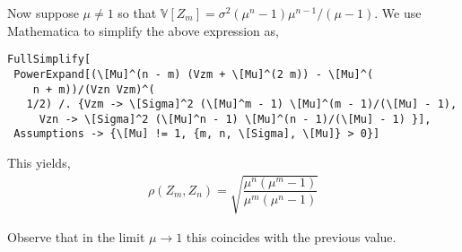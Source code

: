 \begin{solution}[Solution]
Now suppose \( \mu\neq 1 \) so that \( \mathbb{V}[Z_m] = \sigma^2(\mu^n-1)\mu^{n-1}/(\mu-1) \). We use Mathematica to simplify the above expression as,
\begin{lstlisting}
FullSimplify[
 PowerExpand[(\[Mu]^(n - m) (Vzm + \[Mu]^(2 m)) - \[Mu]^(
    n + m))/(Vzn Vzm)^(
   1/2) /. {Vzm -> \[Sigma]^2 (\[Mu]^m - 1) \[Mu]^(m - 1)/(\[Mu] - 1),
     Vzn -> \[Sigma]^2 (\[Mu]^n - 1) \[Mu]^(n - 1)/(\[Mu] - 1) }], 
 Assumptions -> {\[Mu] != 1, {m, n, \[Sigma], \[Mu]} > 0}]
\end{lstlisting}

This yields,
\begin{align*}
    \rho(Z_m,Z_n) = \sqrt{\dfrac{\mu^n(\mu^m-1)}{\mu^m(\mu^n-1)}}
\end{align*}

Observe that in the limit \( \mu\to 1 \) this coincides with the previous value.

\iffalse
\begin{align*}
    \rho(Z_m,Z_n) &= \dfrac{\operatorname{Cov}(Z_n,Z_m)}{(\mathbb{V}[Z_n] \mathbb{V}[Z_m])^{1/2}} \\
    &= \dfrac{\EE[Z_nZ_m]-\EE[Z_n]\EE[Z_m]}{(n\sigma^2m\sigma^2)^{1/2}} \\
    &= \dfrac{\mu^{(n-m)/2}}{\sigma}\sqrt{\dfrac{\mu^m-1}{\mu^n-1}}
\end{align*}
\fi

\iffalse 
Clearly \( Z_n = \sum_{i=1}^{Z_m}Y_{m,i}  \). Then,
\begin{align*}
    \EE[Z_nZ_m] &= \EE\EE \left[ Z_m (Y_{m,1} + Y_{m,2} +...+Y_{m,Z_m} ) \big| Z_m \right] \\
    &= \EE\EE\left[ Z_mY_{m,1}+Z_mY_{m,2}+...+Z_mY_{m,Z_m}\big| Z_m \right] \\
    &= \EE \left[ Z_m \EE[Z_m Z_{n-m}|Z_m]  \right] \\
    &= \EE \left[ Z_m^2 \EE[Z_{n-m}|Z_m]\right] \\
    &= \EE \left[Z_m^2  \mu^{n-m} ] \\
    &= \mu^{n-m}\EE\left[Z_m^2\right]
\end{align*}

Then this is the sum of iid random variables so,
\begin{align*}
    
\end{align*}
\fi
\end{solution}

\begin{problem}[Exercise 3.3]

\end{problem}

